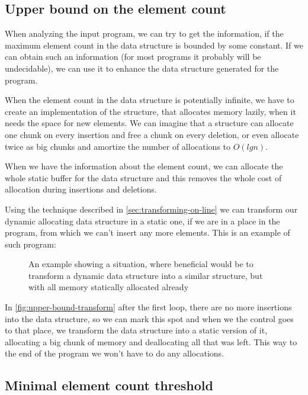 \documentclass[a4paper,11pt]{article}
\begin{document}
	\subsection{Upper bound on the element count}

		When analyzing the input program, we can try to get the information, if the maximum element count in the
		data structure is bounded by some constant. If we can obtain such an information (for most programs it
		probably will be undecidable), we can use it to enhance the data structure generated for the program.

		When the element count in the data structure is potentially infinite, we have to create an
		implementation of the structure, that allocates memory lazily, when it needs the space for new elements.
		We can imagine that a structure can allocate one chunk on every insertion and free a chunk on every
		deletion, or even allocate twice as big chunks and amortize the number of allocations to $O(lg n)$.

		When we have the information about the element count, we can allocate the whole static buffer for the
		data structure and this removes the whole cost of allocation during insertions and deletions.

		Using the technique described in \autoref{sec:transforming-on-line} we can transform our dynamic
		allocating data structure in a static one, if we are in a place in the program, from which we can't
		insert any more elements. This is an example of such program:

		\begin{figure}
			

			\caption{An example showing a situation, where beneficial would be to transform a dynamic data
			structure into a similar structure, but with all memory statically allocated already}

			\label{fig:upper-bound-transform}
		\end{figure}

		In \autoref{fig:upper-bound-transform} after the first loop, there are no more insertions into the data
		structure, so we can mark this spot and when we the control goes to that place, we transform the data
		structure into a static version of it, allocating a big chunk of memory and deallocating all that was
		left. This way to the end of the program we won't have to do any allocations.

	\subsection{Minimal element count threshold}
\end{document}
